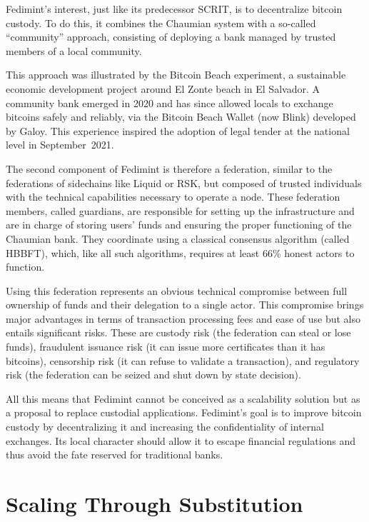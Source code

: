 \documentclass[
  a5paper,
  smalldemyvopaper,10pt,twoside,onecolumn,openright,extrafontsizes,hidelinks]{memoir}
\begin{document}
Fedimint's interest, just like its predecessor SCRIT, is to decentralize
bitcoin custody. To do this, it combines the Chaumian system with a
so-called ``community'' approach, consisting of deploying a bank managed
by trusted members of a local community.

This approach was illustrated by the Bitcoin Beach experiment, a
sustainable economic development project around El Zonte beach in El
Salvador. A community bank emerged in 2020 and has since allowed locals
to exchange bitcoins safely and reliably, via the Bitcoin Beach Wallet
(now Blink) developed by Galoy. This experience inspired the adoption of
legal tender at the national level in September~2021.

The second component of Fedimint is therefore a federation, similar to
the federations of sidechains like Liquid or RSK, but composed of
trusted individuals with the technical capabilities necessary to operate
a node. These federation members, called guardians, are responsible for
setting up the infrastructure and are in charge of storing users' funds
and ensuring the proper functioning of the Chaumian bank. They
coordinate using a classical consensus algorithm (called HBBFT), which,
like all such algorithms, requires at least 66\% honest actors to
function.

Using this federation represents an obvious technical compromise between
full ownership of funds and their delegation to a single actor. This
compromise brings major advantages in terms of transaction processing
fees and ease of use but also entails significant risks. These are
custody risk (the federation can steal or lose funds), fraudulent
issuance risk (it can issue more certificates than it has bitcoins),
censorship risk (it can refuse to validate a transaction), and
regulatory risk (the federation can be seized and shut down by state
decision).

All this means that Fedimint cannot be conceived as a scalability
solution but as a proposal to replace custodial applications. Fedimint's
goal is to improve bitcoin custody by decentralizing it and increasing
the confidentiality of internal exchanges. Its local character should
allow it to escape financial regulations and thus avoid the fate
reserved for traditional banks.

\section*{Scaling Through
Substitution}\label{scaling-through-substitution}
\end{document}

